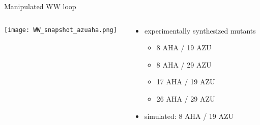 \begin{frame}[t]{Manipulated WW loop}
  \begin{columns}
    \begin{column}{0.5\textwidth}
      \texttt{[image: WW\_snapshot\_azuaha.png]}
    \end{column}
    \begin{column}{0.5\textwidth}
     \begin{itemize}
       \item experimentally synthesized mutants
         \begin{itemize}
           \item 8 AHA / 19 AZU
           \item 8 AHA / 29 AZU
           \item 17 AHA / 19 AZU
           \item 26 AHA / 29 AZU
         \end{itemize}
        \vspace{5mm}
       \item simulated: 8 AHA / 19 AZU
     \end{itemize} 
    \end{column}
  \end{columns} 
\end{frame}
